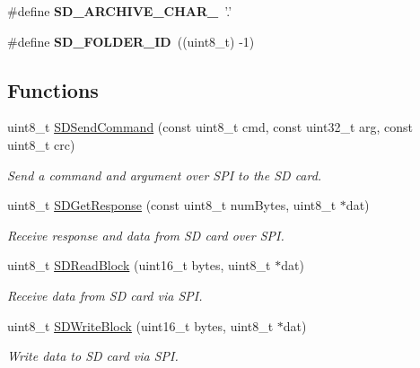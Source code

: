 \begin{DoxyCompactItemize}
\item 
\hypertarget{group__sd__private_ga80e9ec9548aa1a4188e3de1b0806830f}{\#define {\bfseries \-S\-D\-\_\-\-A\-R\-C\-H\-I\-V\-E\-\_\-\-C\-H\-A\-R\-\_\-}~'.'}\label{group__sd__private_ga80e9ec9548aa1a4188e3de1b0806830f}

\item 
\hypertarget{group__sd__private_ga1208dcba96bd99942f07015374be29a7}{\#define {\bfseries \-S\-D\-\_\-\-F\-O\-L\-D\-E\-R\-\_\-\-I\-D}~((uint8\-\_\-t) -\/1)}\label{group__sd__private_ga1208dcba96bd99942f07015374be29a7}

\end{DoxyCompactItemize}
\subsection*{\-Functions}
\begin{DoxyCompactItemize}
\item 
uint8\-\_\-t \hyperlink{group__sd__private_ga8dc156ec08bf1638f5e5690ce1d50955}{\-S\-D\-Send\-Command} (const uint8\-\_\-t cmd, const uint32\-\_\-t arg, const uint8\-\_\-t crc)
\begin{DoxyCompactList}\small\item\em \-Send a command and argument over \-S\-P\-I to the \-S\-D card. \end{DoxyCompactList}\item 
uint8\-\_\-t \hyperlink{group__sd__private_ga8beda4a4b082ddbc6373d209a8b2848e}{\-S\-D\-Get\-Response} (const uint8\-\_\-t num\-Bytes, uint8\-\_\-t $\ast$dat)
\begin{DoxyCompactList}\small\item\em \-Receive response and data from \-S\-D card over \-S\-P\-I. \end{DoxyCompactList}\item 
uint8\-\_\-t \hyperlink{group__sd__private_ga86870ec9efe9cec23e365499247edd85}{\-S\-D\-Read\-Block} (uint16\-\_\-t bytes, uint8\-\_\-t $\ast$dat)
\begin{DoxyCompactList}\small\item\em \-Receive data from \-S\-D card via \-S\-P\-I. \end{DoxyCompactList}\item 
uint8\-\_\-t \hyperlink{group__sd__private_ga7b37d2be5c0daf0e1f56d75b7f20490c}{\-S\-D\-Write\-Block} (uint16\-\_\-t bytes, uint8\-\_\-t $\ast$dat)
\begin{DoxyCompactList}\small\item\em \-Write data to \-S\-D card via \-S\-P\-I. \end{DoxyCompactList}\item 

\end{DoxyCompactItemize}

